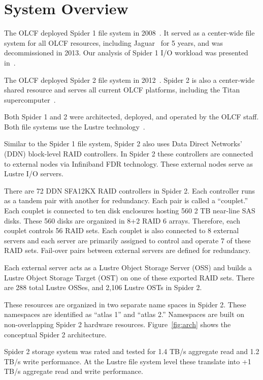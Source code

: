 \section{System Overview}
\label{sec:overview}

The OLCF deployed Spider 1 file system in 2008~\cite{spider1}. It served as a
center-wide file system for all OLCF resources, including Jaguar~\cite{jaguar}
for 5 years, and was decommissioned in 2013. Our analysis of Spider 1 I/O
workload was presented in~\cite{spider1-workload}. 

The OLCF deployed Spider 2 file system in 2012~\cite{spider2}. Spider 2 is also
a center-wide shared resource and serves all current OLCF platforms, including the Titan supercomputer~\cite{titan}.

Both Spider 1 and 2 were architected, deployed, and operated by the OLCF staff.
Both file systems use the Lustre technology~\cite{Lustre}.

Similar to the Spider 1 file system, Spider 2 also uses Data Direct Networks'
(DDN) block-level RAID controllers. In Spider 2 these controllers are connected
to external nodes via Infiniband FDR technology. These external nodes serve as
Lustre I/O servers.

There are 72 DDN  SFA12KX RAID controllers in Spider 2. Each controller runs as
a tandem pair with another for redundancy. Each pair is called a ``couplet.''
Each couplet is connected to ten disk enclosures hosting 560 2 TB near-line SAS
disks. These 560 disks are organized in 8+2 RAID 6 arrays. Therefore, each
couplet controls 56 RAID sets. Each couplet is also connected to 8 external
servers and each server are primarily assigned to control and operate 7 of
these RAID sets. Fail-over pairs between external servers are defined for
redundancy.

Each external server acts as a Lustre Object Storage Server (OSS) and builds a
Lustre Object Storage Target (OST) on one of these exported RAID sets. There
are 288 total Lustre OSSes, and 2,106 Lustre OSTs in Spider 2.

These resources are organized in two separate name spaces in Spider 2. These
namespaces are identified as ``atlas 1'' and ``atlas 2.'' Namespaces are built
on non-overlapping Spider 2 hardware resources. Figure~\ref{fig:arch} shows the conceptual Spider 2 architecture. 

Spider 2 storage system was rated and tested for 1.4 TB/s aggregate read and
1.2 TB/s write performance. At the Lustre file system level these translate
into +1 TB/s aggregate read and write performance.

